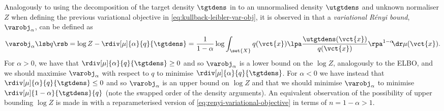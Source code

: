 Analogously to using the decomposition of the target density $\tgtdens$ in to an unnormalised density $\utgtdens$ and unknown normaliser $Z$ when defining the previous variational objective in \eqref{eq:kullback-leibler-var-obj}, it is observed in \citep{li2016renyi} that a \emph{variational R\'{e}nyi bound}, $\varobj_{\alpha}$, can be defined as
\begin{equation}\label{eq:renyi-variational-objective}
\begin{split}
  \varobj_{\alpha}\lsb q \rsb
  = 
  \log Z - \rdiv[\mu]{\alpha}{q}{\tgtdens}
  =
  \frac{1}{1-\alpha} 
  \log \int_{\set{X}} q(\vct{x}) \lpa \frac{\utgtdens(\vct{x})}{q(\vct{x})}\rpa^{1-\alpha} \kern-3pt\dr\mu(\vct{x}).
\end{split}
\end{equation}
For $\alpha > 0$, we have that $\rdiv[\mu]{\alpha}{q}{\tgtdens} \geq 0$ and so $\varobj_\alpha$ is a lower bound on the $\log Z$, analogously to the \ac{ELBO}, and we should maximise $\varobj_\alpha$ with respect to $q$ to minimise $\rdiv[\mu]{\alpha}{q}{\tgtdens}$. For $\alpha < 0$ we have instead that $\rdiv[\mu]{\alpha}{q}{\tgtdens} \leq 0$ and so $\varobj_{\alpha}$ is an upper bound on $\log Z$ and that we should minimise $\varobj_\alpha$ to minimise $\rdiv[\mu]{1-\alpha}{\tgtdens}{q}$ (note the swapped order of the density arguments). An equivalent observation of the possibility of upper bounding $\log Z$ is made in \citep{dieng2016chi} with a reparameterised version of \eqref{eq:renyi-variational-objective} in terms of $n=1-\alpha > 1$.

